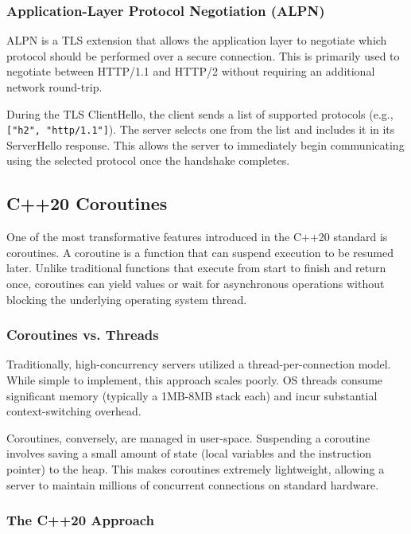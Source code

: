 \subsubsection{Application-Layer Protocol Negotiation (ALPN)}

ALPN is a TLS extension that allows the application layer to negotiate which protocol should be performed over a secure connection. This is primarily used to negotiate between HTTP/1.1 and HTTP/2 without requiring an additional network round-trip.

During the TLS ClientHello, the client sends a list of supported protocols (e.g., \texttt{["h2", "http/1.1"]}). The server selects one from the list and includes it in its ServerHello response. This allows the server to immediately begin communicating using the selected protocol once the handshake completes.

\subsection{C++20 Coroutines}

One of the most transformative features introduced in the C++20 standard is coroutines. A coroutine is a function that can suspend execution to be resumed later. Unlike traditional functions that execute from start to finish and return once, coroutines can yield values or wait for asynchronous operations without blocking the underlying operating system thread.

\subsubsection{Coroutines vs. Threads}

Traditionally, high-concurrency servers utilized a thread-per-connection model. While simple to implement, this approach scales poorly. OS threads consume significant memory (typically a 1MB-8MB stack each) and incur substantial context-switching overhead.

Coroutines, conversely, are managed in user-space. Suspending a coroutine involves saving a small amount of state (local variables and the instruction pointer) to the heap. This makes coroutines extremely lightweight, allowing a server to maintain millions of concurrent connections on standard hardware.

\subsubsection{The C++20 Approach}

